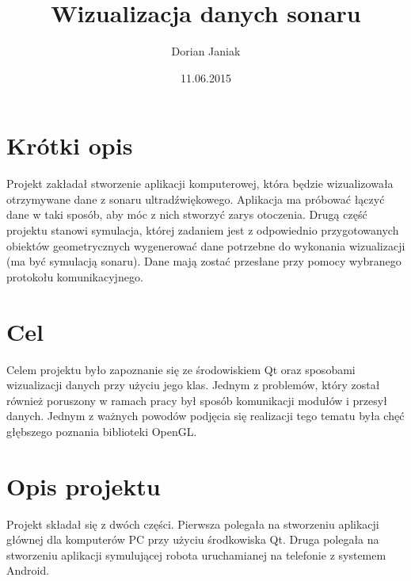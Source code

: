 \documentclass[a4paper,12pt]{article}
\title{Wizualizacja danych sonaru}
\author{Dorian Janiak}
\date{11.06.2015}
\begin{document}
\maketitle

\section{Krótki opis}
Projekt zakładał stworzenie aplikacji komputerowej, która będzie wizualizowała
otrzymywane dane z sonaru ultradźwiękowego. Aplikacja ma próbować łączyć dane
w taki sposób, aby móc z nich stworzyć zarys otoczenia. Drugą część projektu
stanowi symulacja, której zadaniem jest z odpowiednio przygotowanych obiektów
geometrycznych wygenerować dane potrzebne do wykonania wizualizacji 
(ma być symulacją sonaru). 
Dane mają zostać przesłane przy pomocy wybranego protokołu komunikacyjnego.

\section{Cel}
Celem projektu było zapoznanie się ze środowiskiem Qt oraz sposobami wizualizacji danych przy użyciu jego klas.
Jednym z problemów, który został również poruszony w ramach pracy był 
sposób komunikacji modułów i przesył danych. Jednym z ważnych powodów podjęcia się realizacji tego tematu była chęć głębszego poznania biblioteki OpenGL. 




\section{Opis projektu}
Projekt składał się z dwóch części. Pierwsza polegała na stworzeniu aplikacji głównej dla komputerów PC przy użyciu środkowiska Qt. Druga polegała na stworzeniu aplikacji symulującej robota uruchamianej na telefonie z systemem Android.
\end{document}
